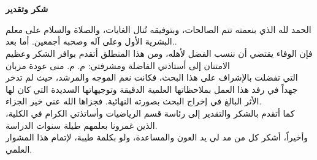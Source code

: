 \chapter*{}

\begin{center}
	\Large\textbf{شكر وتقدير}
\end{center}

\begin{center}
	\amirifont
	الحمد لله الذي بنعمته تتم الصالحات، وبتوفيقه تُنال الغايات، والصلاة والسلام على معلم البشرية الأول وعلى آله وصحبه أجمعين.
	​أما بعد..\\
فإن الوفاء يقتضي أن ننسب الفضل لأهله، ومن هذا المنطلق أتقدم بوافر الشكر وعظيم الامتنان إلى أستاذتي الفاضلة ومشرفتي:
​م. م. منى عودة مزبان\\
التي تفضلت بالإشراف على هذا البحث، فكانت نعم الموجه والمرشد، حيث لم تدخر جهداً في رفد هذا العمل بملاحظاتها العلمية الدقيقة وتوجيهاتها السديدة التي كان لها الأثر البالغ في إخراج البحث بصورته النهائية. فجزاها الله عني خير الجزاء.\\
	كما أتقدم بالشكر والتقدير إلى رئاسة قسم الرياضيات وأساتذتي الكرام في الكلية، الذين غمرونا بعلمهم طيلة سنوات الدراسة.\\
	وأخيراً، أشكر كل من مد لي يد العون والمساعدة، ولو بكلمة طيبة، لإتمام هذا المشوار العلمي.
\end{center}